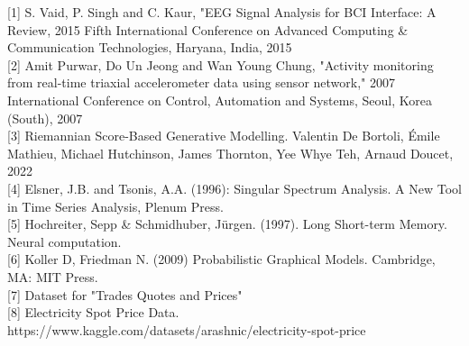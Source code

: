 \documentclass{article}
\begin{document}





[1] S. Vaid, P. Singh and C. Kaur, "EEG Signal Analysis for BCI Interface: A Review, 2015 Fifth International Conference on Advanced Computing \& Communication Technologies, Haryana, India, 2015 \\

[2] Amit Purwar, Do Un Jeong and Wan Young Chung, "Activity monitoring from real-time triaxial accelerometer data using sensor network," 2007 International Conference on Control, Automation and Systems, Seoul, Korea (South), 2007 \\

[3] Riemannian Score-Based Generative Modelling. 
Valentin De Bortoli, Émile Mathieu, Michael Hutchinson, James Thornton, Yee Whye Teh, Arnaud Doucet, 2022 \\

[4] Elsner, J.B. and Tsonis, A.A. (1996): Singular Spectrum Analysis. A New Tool in Time Series Analysis, Plenum Press. \\

[5] Hochreiter, Sepp \& Schmidhuber, Jürgen. (1997). Long Short-term Memory. Neural computation. \\

[6] Koller D, Friedman N. (2009) Probabilistic Graphical Models. Cambridge, MA: MIT Press. \\

[7] Dataset for "Trades Quotes and Prices" \\

[8] Electricity Spot Price Data. 
https://www.kaggle.com/datasets/arashnic/electricity-spot-price \\


\end{document}

